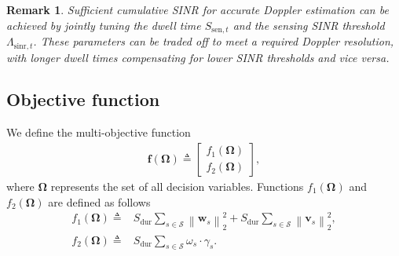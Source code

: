 \documentclass[10pt,journal,compsoc]{IEEEtran}
\theoremstyle{myremark}
\newtheorem{remark}{Remark}
\theoremstyle{myexample}
\begin{document}
\begin{remark} \label{rmk:clarification-doppler-resolution}
	Sufficient cumulative SINR for accurate Doppler estimation can be achieved by jointly tuning the dwell time $ S_{\mathrm{sen},t} $ and the sensing SINR threshold $ \Lambda_{\mathrm{sinr},t} $. These parameters can be traded off to meet a required Doppler resolution, with longer dwell times compensating for lower SINR thresholds and vice versa.
\end{remark}







\subsection{Objective function}

We define the multi-objective function 
\begin{align} 
	  \mathbf{f} \left( \boldsymbol{\Omega} \right) 
	  \triangleq 
	  \begin{bmatrix} 
	  f_1 \left( \boldsymbol{\Omega} \right) 
	  \\  
	  f_2 \left( \boldsymbol{\Omega} \right) 
	  \end{bmatrix},
\end{align}
where $ \boldsymbol{\Omega} $ represents the set of all decision variables. Functions $ f_1 \left( \boldsymbol{\Omega} \right) $ and $ f_2 \left( \boldsymbol{\Omega} \right) $ are defined as follows
\begin{align*} 
	f_1 \left( \boldsymbol{\Omega} \right) \triangleq & S_\mathrm{dur} \textstyle \sum_{s \in \mathcal{S}} \left\| \mathbf{w}_s \right\|_2^2 + S_\mathrm{dur} \sum_{s \in \mathcal{S}} \left\| \mathbf{v}_s \right\|_2^2,
	\\ 
	f_2 \left( \boldsymbol{\Omega} \right) \triangleq & \textstyle S_\mathrm{dur} \sum_{s \in \mathcal{S}} \omega_{s} \cdot \gamma_s.
\end{align*}




\end{document}

